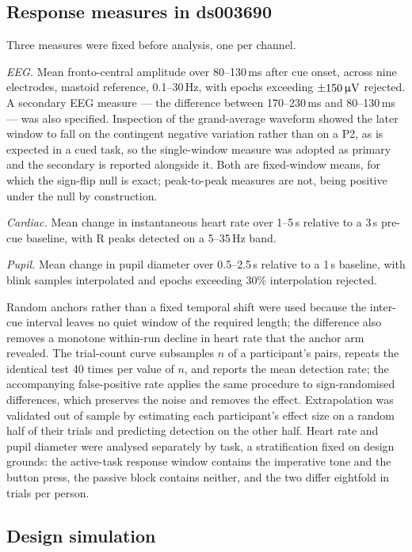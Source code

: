 \subsection{Response measures in ds003690}

Three measures were fixed before analysis, one per channel.

\emph{EEG.} Mean fronto-central amplitude over 80--130\,ms after cue onset,
across nine electrodes, mastoid reference, 0.1--30\,Hz, with epochs exceeding
$\pm 150\,\upmu\mathrm{V}$ rejected. A secondary EEG measure --- the difference between
170--230\,ms and 80--130\,ms --- was also specified. Inspection of the
grand-average waveform showed the later window to fall on the contingent
negative variation rather than on a P2, as is expected in a cued task, so the
single-window measure was adopted as primary and the secondary is reported
alongside it. Both are fixed-window means, for which the sign-flip null is
exact; peak-to-peak measures are not, being positive under the null by
construction.

\emph{Cardiac.} Mean change in instantaneous heart rate over 1--5\,s relative
to a 3\,s pre-cue baseline, with R peaks detected on a 5--35\,Hz band.

\emph{Pupil.} Mean change in pupil diameter over 0.5--2.5\,s relative to a
1\,s baseline, with blink samples interpolated and epochs exceeding 30\%
interpolation rejected.

Random anchors rather than a fixed temporal shift were used because the
inter-cue interval leaves no quiet window of the required length; the
difference also removes a monotone within-run decline in heart rate that the
anchor arm revealed. The trial-count curve subsamples $n$ of a participant's
pairs, repeats the identical test 40 times per value of $n$, and reports the
mean detection rate; the accompanying false-positive rate applies the same
procedure to sign-randomised differences, which preserves the noise and
removes the effect. Extrapolation was validated out of sample by estimating
each participant's effect size on a random half of their trials and predicting
detection on the other half. Heart rate and pupil diameter were analysed
separately by task, a stratification fixed on design grounds: the active-task
response window contains the imperative tone and the button press, the passive
block contains neither, and the two differ eightfold in trials per person.

\subsection{Design simulation}

